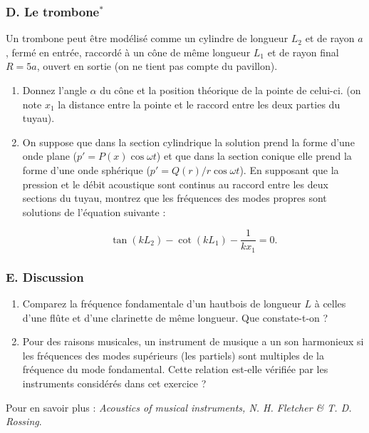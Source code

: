 \subsubsection*{D. Le trombone$^*$}

Un trombone peut être modélisé comme un cylindre de longueur $L_2$ et de rayon $a$, fermé en entrée, raccordé à un cône de même longueur $L_1$ et de rayon final $R = 5a$, ouvert en sortie (on ne tient pas compte du pavillon).

\begin{enumerate}

\item Donnez l'angle $\alpha$ du cône et la position théorique de la pointe de celui-ci.
(on note $x_1$ la distance entre la pointe et le raccord entre les deux parties du tuyau).

\item On suppose que dans la section cylindrique la solution prend la forme d'une onde plane ($p' = P(x) \cos \omega t $) et que dans la section conique elle prend la forme d'une onde sphérique 
($p' = Q(r)/r \cos \omega t$). En supposant que la pression et le débit acoustique sont continus au raccord entre les deux sections du tuyau, montrez que les fréquences des modes propres
sont solutions de l'équation suivante :

$$
\tan (k L_2) - \cot (k L_1) - \frac{1}{kx_1} = 0.
$$

\end{enumerate}

\subsubsection*{E. Discussion}

\begin{enumerate}
\item Comparez la fréquence fondamentale d'un hautbois de longueur $L$ à celles d'une flûte et d'une clarinette de même longueur. Que constate-t-on ?

\item Pour des raisons musicales, un instrument de musique a un son harmonieux si les fréquences des modes supérieurs (les partiels) sont multiples de la fréquence du mode fondamental. Cette relation est-elle vérifiée par les instruments considérés dans cet exercice ?


\end{enumerate}

Pour en savoir plus : {\em Acoustics of musical instruments, N. H. Fletcher \& T. D. Rossing}.



